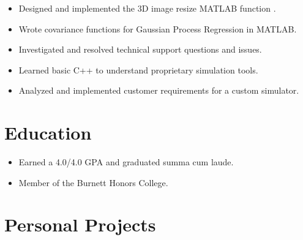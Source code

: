 \documentclass[letterpaper]{resume}
\begin{document}
\begin{minipage}[t]{0.72\columnwidth}
\sectionspace

\begin{itemize}
\item Designed and implemented the 3D image resize MATLAB function .
\item Wrote covariance functions for Gaussian Process Regression in MATLAB.
\item Investigated and resolved technical support questions and issues.
\end{itemize}

\sectionspace

\begin{itemize}
\item Learned basic C++ to understand proprietary simulation tools.
\item Analyzed and implemented customer requirements for a custom simulator.
\end{itemize}

\sectionspace


\section{Education}

\begin{itemize}
\item Earned a 4.0/4.0 GPA and graduated summa cum laude.
\item Member of the Burnett Honors College.
\end{itemize}

\sectionspace


\section{Personal Projects}


\end{minipage}
\end{document}
